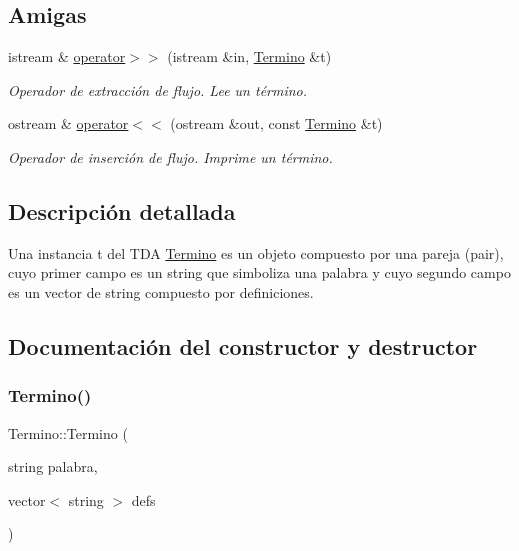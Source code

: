 \subsection*{Amigas}
\begin{DoxyCompactItemize}
\item 
istream \& \hyperlink{classTermino_a42f635c3609287dbbf2bd65d035fa7f8}{operator$>$$>$} (istream \&in, \hyperlink{classTermino}{Termino} \&t)
\begin{DoxyCompactList}\small\item\em Operador de extracción de flujo. Lee un término. \end{DoxyCompactList}\item 
ostream \& \hyperlink{classTermino_a3f023e4474dc0034666373694cfc08b8}{operator$<$$<$} (ostream \&out, const \hyperlink{classTermino}{Termino} \&t)
\begin{DoxyCompactList}\small\item\em Operador de inserción de flujo. Imprime un término. \end{DoxyCompactList}\end{DoxyCompactItemize}


\subsection{Descripción detallada}
Una instancia t del T\+DA \hyperlink{classTermino}{Termino} es un objeto compuesto por una pareja (pair), cuyo primer campo es un string que simboliza una palabra y cuyo segundo campo es un vector de string compuesto por definiciones. 

\subsection{Documentación del constructor y destructor}
\mbox{\label{classTermino_a9ec8e65752439d7f58be1a7ee7334e0b}} 
\subsubsection{\texorpdfstring{Termino()}{Termino()}\hspace{0.1cm}{\footnotesize\ttfamily [1/2]}}
{\footnotesize\ttfamily Termino\+::\+Termino (\begin{DoxyParamCaption}\item[{string}]{palabra,  }\item[{vector$<$ string $>$}]{defs }\end{DoxyParamCaption})}



